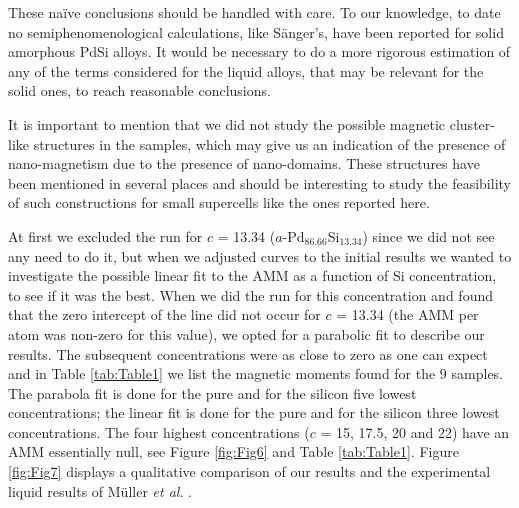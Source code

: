 \documentclass[fleqn,12pt]{wlscirep}
\begin{document}
These na\"{i}ve conclusions should be handled with care. To our knowledge, to date no semiphenomenological calculations, like S\"{a}nger's, have been reported for solid amorphous PdSi alloys. It would be necessary to do a more rigorous estimation of any of the terms considered for the liquid alloys, that may be relevant for the solid ones, to reach reasonable conclusions.

It is important to mention that we did not study the possible magnetic cluster-like structures \cite{Handbook_2019} in the samples, which may give us an indication of the presence of nano-magnetism due to the presence of nano-domains. These structures have been mentioned in several places and should be interesting to study the feasibility of such constructions for small supercells like the ones reported here.

At first we excluded the run for $c$ = 13.34 ($a$-Pd$_{86.66}$Si$_{13.34}$) since we did not see any need to do it, but when we adjusted curves to the initial results we wanted to investigate the possible linear fit to the AMM as a function of Si concentration, to see if it was the best. When we did the run for this concentration and found that the zero intercept of the line did not occur for $c$ = 13.34 (the AMM per atom was non-zero for this value), we opted for a parabolic fit to describe our results. The subsequent concentrations were as close to zero as one can expect and in Table \ref{tab:Table1} we list the magnetic moments found for the 9 samples. The parabola fit is done for the pure and for the silicon five lowest concentrations; the linear fit is done for the pure and for the silicon three lowest concentrations.  The four highest concentrations ($c$ = 15, 17.5, 20 and 22) have an AMM essentially null, see Figure \ref{fig:Fig6} and Table \ref{tab:Table1}. Figure \ref{fig:Fig7} displays a qualitative comparison of our results and the experimental liquid results of M\"{u}ller \textit{et al}. \cite{Muller_1978}.
\end{document}
